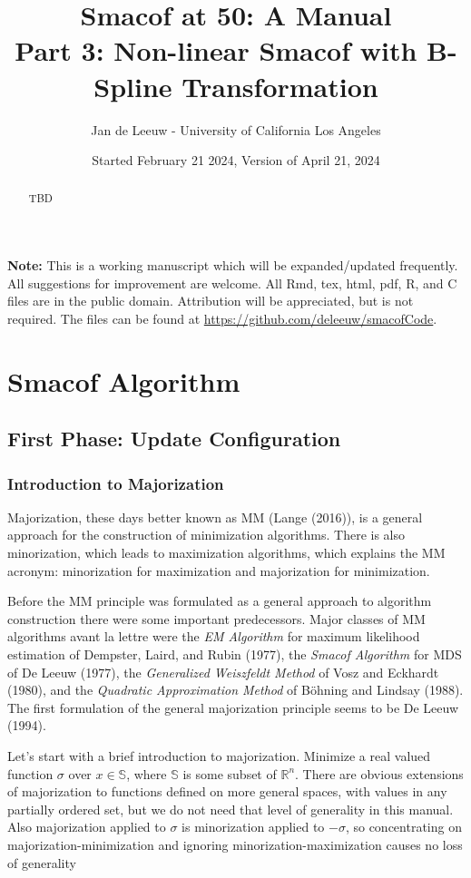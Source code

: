 \documentclass[
  12pt,
]{article}
\title{Smacof at 50: A Manual\\
Part 3: Non-linear Smacof with B-Spline Transformation}
\author{Jan de Leeuw - University of California Los Angeles}
\date{Started February 21 2024, Version of April 21, 2024}
\newcommand{\sectionbreak}{\clearpage}
\begin{document}
\maketitle
\begin{abstract}
TBD
\end{abstract}

{
\setcounter{tocdepth}{4}
\tableofcontents
}
\textbf{Note:} This is a working manuscript which will be expanded/updated
frequently. All suggestions for improvement are welcome. All Rmd, tex,
html, pdf, R, and C files are in the public domain. Attribution will be
appreciated, but is not required. The files can be found at
\url{https://github.com/deleeuw/smacofCode}.

\sectionbreak

\section{Smacof Algorithm}\label{smacof-algorithm}

\subsection{First Phase: Update Configuration}\label{first-phase-update-configuration}

\subsubsection{Introduction to Majorization}\label{introduction-to-majorization}

Majorization, these days better known as MM (Lange (2016)), is a general
approach for the construction of minimization algorithms. There is also
minorization, which leads to maximization algorithms, which explains the
MM acronym: minorization for maximization and majorization for
minimization.

Before the MM principle was formulated as a general approach to
algorithm construction there were some important predecessors. Major
classes of MM algorithms avant la lettre were the \emph{EM Algorithm} for
maximum likelihood estimation of Dempster, Laird, and Rubin (1977), the \emph{Smacof
Algorithm} for MDS of De Leeuw (1977), the \emph{Generalized Weiszfeldt Method}
of Vosz and Eckhardt (1980), and the \emph{Quadratic Approximation Method} of
Böhning and Lindsay (1988). The first formulation of the general majorization
principle seems to be De Leeuw (1994).

Let's start with a brief introduction to majorization. Minimize a real
valued function \(\sigma\) over \(x\in\mathbb{S}\), where \(\mathbb{S}\) is
some subset of \(\mathbb{R}^n\). There are obvious extensions of
majorization to functions defined on more general spaces, with values in
any partially ordered set, but we do not need that level of generality
in this manual. Also majorization applied to \(\sigma\) is minorization
applied to \(-\sigma\), so concentrating on majorization-minimization and
ignoring minorization-maximization causes no loss of generality
\end{document}
